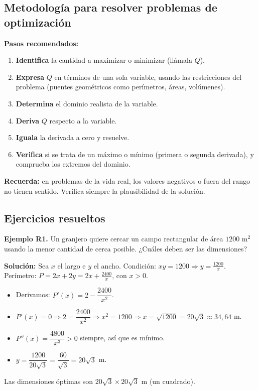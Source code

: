 \documentclass[12pt, a4paper]{article}
\begin{document}
\subsection{Metodología para resolver problemas de optimización}

\begin{cuadroteoria}
  \textbf{Pasos recomendados:}
  \begin{enumerate}
    \item \textbf{Identifica} la cantidad a maximizar o minimizar (llámala $Q$).
    \item \textbf{Expresa} $Q$ en términos de una sola variable, usando las restricciones del problema (puentes geométricos como perímetros, áreas, volúmenes).
    \item \textbf{Determina} el dominio realista de la variable.
    \item \textbf{Deriva} $Q$ respecto a la variable.
    \item \textbf{Iguala} la derivada a cero y resuelve.
    \item \textbf{Verifica} si se trata de un máximo o mínimo (primera o segunda derivada), y comprueba los extremos del dominio.
  \end{enumerate}
\end{cuadroteoria}

\begin{cuadroadvertencia}
  \textbf{Recuerda:} en problemas de la vida real, los valores negativos o fuera del rango no tienen sentido. Verifica siempre la plausibilidad de la solución.
\end{cuadroadvertencia}

\subsection{Ejercicios resueltos}

\textbf{Ejemplo R1.} Un granjero quiere cercar un campo rectangular de área $1200$ m$^2$ usando la menor cantidad de cerca posible. ¿Cuáles deben ser las dimensiones?

\begin{cuadrosolucion}
  \textbf{Solución:} Sea $x$ el largo e $y$ el ancho. Condición: $xy = 1200 \Rightarrow y = \frac{1200}{x}$. Perímetro: $P = 2x + 2y = 2x + \frac{2400}{x}$, con $x > 0$.
  \begin{itemize}
    \item Derivamos: $P'(x) = 2 - \dfrac{2400}{x^2}$.
    \item $P'(x) = 0 \Rightarrow 2 = \dfrac{2400}{x^2} \Rightarrow x^2 = 1200 \Rightarrow x = \sqrt{1200} = 20\sqrt{3} \approx 34{,}64$ m.
    \item $P''(x) = \dfrac{4800}{x^3} > 0$ siempre, así que es mínimo.
    \item $y = \dfrac{1200}{20\sqrt{3}} = \dfrac{60}{\sqrt{3}} = 20\sqrt{3}$ m.
  \end{itemize}
  Las dimensiones óptimas son $20\sqrt{3} \times 20\sqrt{3}$ m (un cuadrado).
\end{cuadrosolucion}
\end{document}
